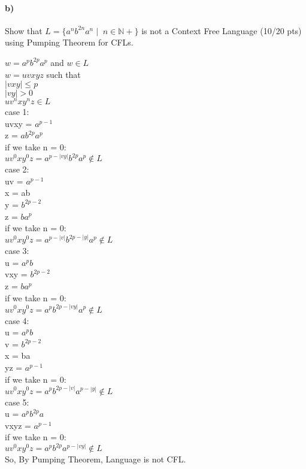\documentclass[a4paper,12pt]{article}
\begin{document}
\paragraph{b)} Show that $L=\{a^n b^{2n} a^n \mid \; n \in \mathbb{N+} \}$ is not a Context Free Language \hfill \small{(10/20 pts)} \\
using Pumping Theorem for CFLs. \\

\begin{tcolorbox}

$w = a^p b^{2p} a^p$ and $ w \in L$ \\
$w = uvxyz$ such that \\
$|vxy|\leq p$ \\
$|vy| > 0$ \\
$u v^n x y^n z \in L$ \\

case 1: \\

uvxy = $a^{p-1} $ \\
z = $a b^{2p} a^p$\\
if we take n = 0: \\
$u v^0 x y^0 z = a^{p - |vy|} b^{2p} a^p \notin L$\\

case 2:\\

uv = $a^{p-1}$ \\
x = ab \\
y = $b^{2p-2}$ \\
z = $b a^p$ \\
if we take n = 0: \\
$u v^0 x y^0 z = a^{p - |v|} b^{2p-|y|} a^p \notin L$\\

case 3:\\

u = $a^p b$ \\
vxy = $b^{2p-2}$ \\
z = $b a^p$ \\
if we take n = 0: \\
$u v^0 x y^0 z = a^p  b^{2p-|vy|} a^p \notin L$\\

case 4: \\

u = $a^p b$ \\
v = $b^{2p-2}$ \\
x = ba \\
yz = $a^{p-1}$ \\
if we take n = 0: \\
$u v^0 x y^0 z = a^p  b^{2p-|v|} a^{p-|y|} \notin L$\\

case 5: \\
u = $a^p b^{2p} a$ \\
vxyz = $a^{p-1}$\\
if we take n = 0: \\
$u v^0 x y^0 z = a^p  b^{2p} a^{p-|vy|} \notin L$\\

So, By Pumping Theorem, Language is not CFL. \\

\end{tcolorbox}
\end{document}
